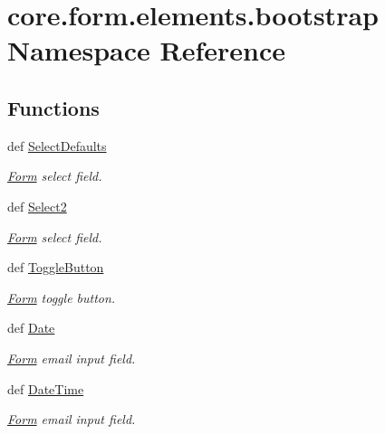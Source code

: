\hypertarget{namespacecore_1_1form_1_1elements_1_1bootstrap}{\section{core.\-form.\-elements.\-bootstrap Namespace Reference}
\label{namespacecore_1_1form_1_1elements_1_1bootstrap}
}
\subsection*{Functions}
\begin{DoxyCompactItemize}
\item 
def \hyperlink{namespacecore_1_1form_1_1elements_1_1bootstrap_aea3a621da865caec725483015f74c7bf}{Select\-Defaults}
\begin{DoxyCompactList}\small\item\em \hyperlink{classcore_1_1form_1_1Form}{Form} select field. \end{DoxyCompactList}\item 
def \hyperlink{namespacecore_1_1form_1_1elements_1_1bootstrap_aee7c01b492ceb180703a6ab6f5dc144d}{Select2}
\begin{DoxyCompactList}\small\item\em \hyperlink{classcore_1_1form_1_1Form}{Form} select field. \end{DoxyCompactList}\item 
def \hyperlink{namespacecore_1_1form_1_1elements_1_1bootstrap_aa68b21c31920b6c1bd03d2ba4c67a5b4}{Toggle\-Button}
\begin{DoxyCompactList}\small\item\em \hyperlink{classcore_1_1form_1_1Form}{Form} toggle button. \end{DoxyCompactList}\item 
def \hyperlink{namespacecore_1_1form_1_1elements_1_1bootstrap_aa1ce077ff8c3fef0689bdb67603bc446}{Date}
\begin{DoxyCompactList}\small\item\em \hyperlink{classcore_1_1form_1_1Form}{Form} email input field. \end{DoxyCompactList}\item 
def \hyperlink{namespacecore_1_1form_1_1elements_1_1bootstrap_a2d2d6e6d905d5c286f5f8d69bf6f8792}{Date\-Time}
\begin{DoxyCompactList}\small\item\em \hyperlink{classcore_1_1form_1_1Form}{Form} email input field. \end{DoxyCompactList}\end{DoxyCompactItemize}


